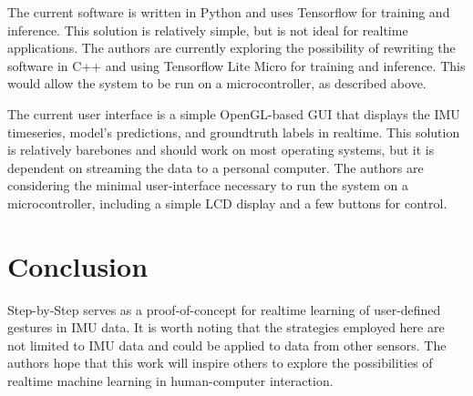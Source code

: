 \documentclass{nime-alternate} %
\begin{document}
The current software is written in Python and uses Tensorflow for training and inference. This solution is relatively simple, but is not ideal for realtime applications. The authors are currently exploring the possibility of rewriting the software in C++ and using Tensorflow Lite Micro for training and inference. This would allow the system to be run on a microcontroller, as described above.

The current user interface is a simple OpenGL-based GUI that displays the IMU timeseries, model's predictions, and groundtruth labels in realtime. This solution is relatively barebones and should work on most operating systems, but it is dependent on streaming the data to a personal computer. The authors are considering the minimal user-interface necessary to run the system on a microcontroller, including a simple LCD display and a few buttons for control.


\section{Conclusion}
Step-by-Step serves as a proof-of-concept for realtime learning of user-defined gestures in IMU data. It is worth noting that the strategies employed here are not limited to IMU data and could be applied to data from other sensors. The authors hope that this work will inspire others to explore the possibilities of realtime machine learning in human-computer interaction.






 



\end{document}
